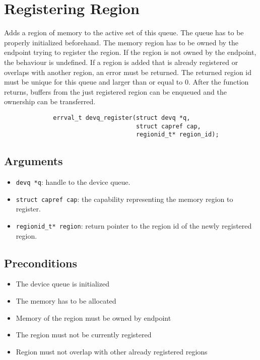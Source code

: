\documentclass[a4paper,11pt,twoside]{report}
\begin{document}
	\section{Registering Region}
	Adds a region of memory to the active set of this queue. 
	The queue has to be properly initialized beforehand. 
	The memory region has to be owned by the endpoint trying to register the region. 
	If the region is not owned by the endpoint, the behaviour is undefined.
	If a region is added that is already registered or overlaps with another region, an error must be returned. 
	The returned region id must be unique for this queue and larger than or equal to 0. After the function returns, 
	buffers from the just registered region can be enqueued and the ownership
	can be transferred. 
	\begin{figure}[h]
		\begin{lstlisting}
        errval_t devq_register(struct devq *q,
                               struct capref cap,
                               regionid_t* region_id);
		\end{lstlisting}
		\label{lst:register}
	\end{figure}
	
	\subsection*{Arguments}
	\begin{itemize}
		\item \texttt{devq *q}: handle to the device queue.
		\item \texttt{struct capref cap}: the capability representing the memory region to register.
		\item \texttt{regionid\_t* region}: return pointer to the region id of the newly registered region.
	\end{itemize}
	\subsection*{Preconditions}
	\begin{itemize}
		\item The device queue is initialized
		\item The memory has to be allocated
		\item Memory of the region must be owned by endpoint 
		\item The region must not be currently registered
		\item Region must not overlap with other already registered regions 
	\end{itemize}
\end{document}
